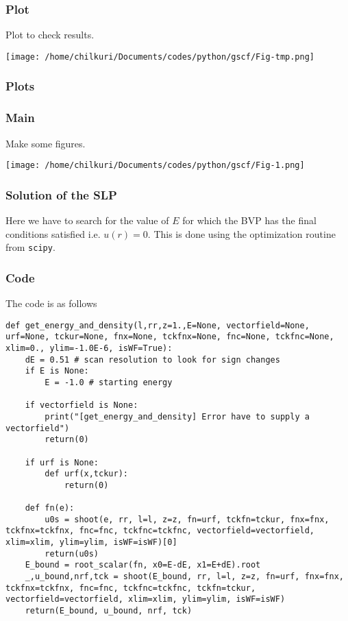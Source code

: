 \documentclass[11pt,a4paper]{article}
\begin{document}
\subsubsection{Plot}
\label{sec:org953b6bb}
Plot to check results.
\begin{center}
\texttt{[image: /home/chilkuri/Documents/codes/python/gscf/Fig-tmp.png]}
\end{center}

\subsubsection{Plots}
\label{sec:org12bf04b}
\subsubsection{Main}
\label{sec:orgee794dc}
Make some figures.
\begin{center}
\texttt{[image: /home/chilkuri/Documents/codes/python/gscf/Fig-1.png]}
\end{center}

\subsubsection{Solution of the SLP}
\label{sec:org8681974}

Here we have to search for the value of \(E\)
for which the BVP has the final conditions satisfied
i.e. \(u(r)=0\). This is done using the optimization
routine from \texttt{scipy}.

\subsubsection{Code}
\label{sec:org0e3ad7a}

The code is as follows

\begin{verbatim}
def get_energy_and_density(l,rr,z=1.,E=None, vectorfield=None, urf=None, tckur=None, fnx=None, tckfnx=None, fnc=None, tckfnc=None, xlim=0., ylim=-1.0E-6, isWF=True):
    dE = 0.51 # scan resolution to look for sign changes
    if E is None:
        E = -1.0 # starting energy

    if vectorfield is None:
        print("[get_energy_and_density] Error have to supply a vectorfield")
        return(0)

    if urf is None:
        def urf(x,tckur):
            return(0)

    def fn(e):
        u0s = shoot(e, rr, l=l, z=z, fn=urf, tckfn=tckur, fnx=fnx, tckfnx=tckfnx, fnc=fnc, tckfnc=tckfnc, vectorfield=vectorfield, xlim=xlim, ylim=ylim, isWF=isWF)[0]
        return(u0s)
    E_bound = root_scalar(fn, x0=E-dE, x1=E+dE).root
    _,u_bound,nrf,tck = shoot(E_bound, rr, l=l, z=z, fn=urf, fnx=fnx, tckfnx=tckfnx, fnc=fnc, tckfnc=tckfnc, tckfn=tckur, vectorfield=vectorfield, xlim=xlim, ylim=ylim, isWF=isWF)
    return(E_bound, u_bound, nrf, tck)
\end{verbatim}
\end{document}
